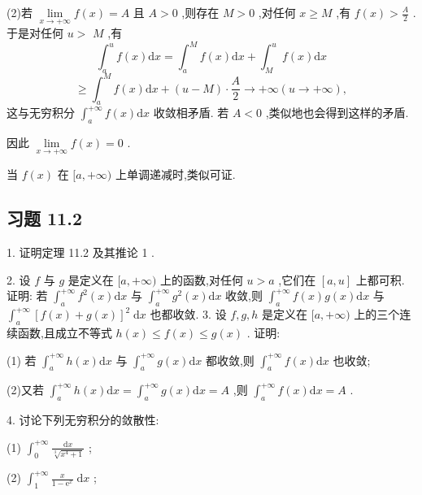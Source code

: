 (2)若 \(\mathop{\lim }\limits_{{x \rightarrow   + \infty }}f\left( x\right)  = A\) 且 \(A > 0\) ,则存在 \(M > 0\) ,对任何 \(x \geq  M\) ,有 \(f\left( x\right)  > \frac{A}{2}\) . 于是对任何 \(u >\)  \(M\) ,有
\[
{\int }_{a}^{u}f\left( x\right) \mathrm{d}x = {\int }_{a}^{M}f\left( x\right) \mathrm{d}x + {\int }_{M}^{u}f\left( x\right) \mathrm{d}x
\]
\[
\geq  {\int }_{a}^{M}f\left( x\right) \mathrm{d}x + \left( {u - M}\right)  \cdot  \frac{A}{2} \rightarrow   + \infty \left( {u \rightarrow   + \infty }\right) ,
\]
这与无穷积分 \({\int }_{a}^{+\infty }f\left( x\right) \mathrm{d}x\) 收敛相矛盾. 若 \(A < 0\) ,类似地也会得到这样的矛盾.

因此 \(\mathop{\lim }\limits_{{x \rightarrow   + \infty }}f\left( x\right)  = 0\) .

当 \(f\left( x\right)\) 在 \(\lbrack a, + \infty )\) 上单调递减时,类似可证.

\subsection{习题 11.2}

1. 证明定理 11.2 及其推论 1 .

2. 设 \(f\) 与 \(g\) 是定义在 \(\lbrack a, + \infty )\) 上的函数,对任何 \(u > a\) ,它们在 \(\left\lbrack  {a,u}\right\rbrack\) 上都可积. 证明: 若 \({\int }_{a}^{+\infty }{f}^{2}\left( x\right) \mathrm{d}x\) 与 \({\int }_{a}^{+\infty }{g}^{2}\left( x\right) \mathrm{d}x\) 收敛,则 \({\int }_{a}^{+\infty }f\left( x\right) g\left( x\right) \mathrm{d}x\) 与 \({\int }_{a}^{+\infty }{\left\lbrack  f\left( x\right)  + g\left( x\right) \right\rbrack  }^{2}\mathrm{\;d}x\) 也都收敛. 3. 设 \(f,g,h\) 是定义在 \(\lbrack a, + \infty )\) 上的三个连续函数,且成立不等式 \(h\left( x\right)  \leq  f\left( x\right)  \leq  g\left( x\right)\) . 证明:

(1) 若 \({\int }_{a}^{+\infty }h\left( x\right) \mathrm{d}x\) 与 \({\int }_{a}^{+\infty }g\left( x\right) \mathrm{d}x\) 都收敛,则 \({\int }_{a}^{+\infty }f\left( x\right) \mathrm{d}x\) 也收敛;

(2)又若 \({\int }_{a}^{+\infty }h\left( x\right) \mathrm{d}x = {\int }_{a}^{+\infty }g\left( x\right) \mathrm{d}x = A\) ,则 \({\int }_{a}^{+\infty }f\left( x\right) \mathrm{d}x = A\) .

4. 讨论下列无穷积分的敛散性:

(1) \({\int }_{0}^{+\infty }\frac{\mathrm{d}x}{\sqrt[3]{{x}^{4} + 1}}\) ;

(2) \({\int }_{1}^{+\infty }\frac{x}{1 - {\mathrm{e}}^{x}}\mathrm{\;d}x\) ;

